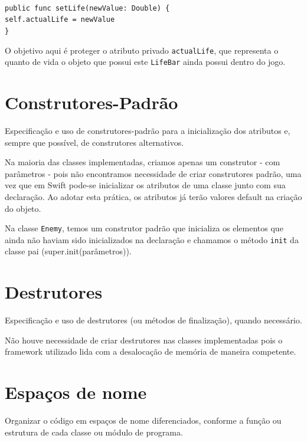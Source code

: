 \documentclass[rel_mlp]{iiufrgs}
\newcommand\tab[1][1cm]{\hspace*{#1}}
\begin{document}
\texttt{\\public func setLife(newValue: Double) \{\\\tab self.actualLife = newValue\\\}}
    
O objetivo aqui é proteger o atributo privado \texttt{actualLife}, que representa o quanto de vida o objeto que possui este \texttt{LifeBar} ainda possui dentro do jogo.


\section{Construtores-Padrão}

Especificação e uso de construtores-padrão para a inicialização dos atributos e, sempre que possível, de construtores alternativos.

Na maioria das classes implementadas, criamos apenas um construtor - com parâmetros - pois não encontramos necessidade de criar construtores padrão, uma vez que em Swift pode-se inicializar os atributos de uma classe junto com sua declaração. Ao adotar esta prática, os atributos já terão valores default na criação do objeto.

Na classe \texttt{Enemy}, temos um construtor padrão que inicializa os elementos que ainda não haviam sido inicializados na declaração e chamamos o método \texttt{init} da classe pai (super.init(parâmetros)).


\section{Destrutores}

Especificação e uso de destrutores (ou métodos de finalização), quando necessário.

Não houve necessidade de criar destrutores nas classes implementadas pois o framework utilizado lida com a desalocação de memória de maneira competente.


\section{Espaços de nome}

Organizar o código em espaços de nome diferenciados, conforme a função ou estrutura de cada classe ou módulo de programa.
\end{document}
